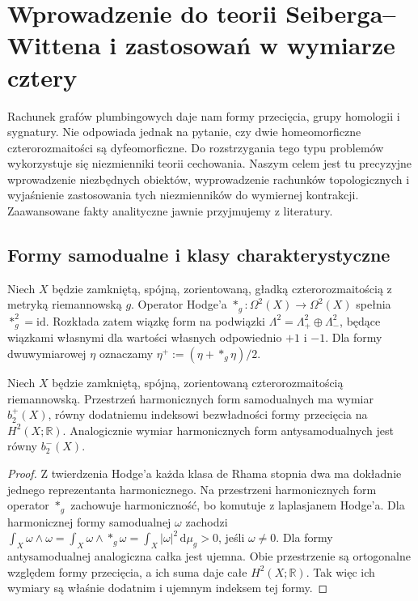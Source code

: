 \chapter{Wprowadzenie do teorii Seiberga--Wittena i zastosowań w wymiarze cztery}
\label{ch:tg-sw}

Rachunek grafów plumbingowych daje nam formy przecięcia,
grupy homologii i sygnatury. Nie odpowiada jednak na pytanie,
czy dwie homeomorficzne czterorozmaitości są dyfeomorficzne.
Do rozstrzygania tego typu problemów wykorzystuje się
niezmienniki teorii cechowania. Naszym celem jest tu
precyzyjne wprowadzenie niezbędnych obiektów, wyprowadzenie
rachunków topologicznych i wyjaśnienie zastosowania tych
niezmienników do wymiernej kontrakcji. Zaawansowane
fakty analityczne jawnie przyjmujemy z literatury.

\section{Formy samodualne i klasy charakterystyczne}
\label{sec:tg-sw-selfdual}

Niech $X$ będzie zamkniętą, spójną, zorientowaną,
gładką czterorozmaitością z metryką riemannowską $g$.
Operator Hodge'a $*_g:\Omega^2(X)\to\Omega^2(X)$ spełnia
$*_g^2=\mathrm{id}$. Rozkłada zatem wiązkę form na podwiązki
$\Lambda^2=\Lambda^2_+\oplus\Lambda^2_-$, będące wiązkami
własnymi dla wartości własnych odpowiednio $+1$ i $-1$.
Dla formy dwuwymiarowej $\eta$ oznaczamy
$\eta^+:=(\eta+*_g\eta)/2$.

\begin{stwierdzenie}
Niech $X$ będzie zamkniętą, spójną, zorientowaną
czterorozmaitością riemannowską. Przestrzeń harmonicznych
form samodualnych ma wymiar $b_2^+(X)$, równy dodatniemu
indeksowi bezwładności formy przecięcia na $H^2(X;\mathbb R)$.
Analogicznie wymiar harmonicznych form antysamodualnych
jest równy $b_2^-(X)$.
\end{stwierdzenie}

\begin{proof}
Z twierdzenia Hodge'a każda klasa de Rhama stopnia dwa
ma dokładnie jednego reprezentanta harmonicznego.
Na przestrzeni harmonicznych form operator $*_g$ zachowuje
harmoniczność, bo komutuje z laplasjanem Hodge'a.
Dla harmonicznej formy samodualnej $\omega$ zachodzi
$\int_X\omega\wedge\omega=\int_X\omega\wedge*_g\omega
=\int_X|\omega|^2\,\mathrm d\mu_g>0$, jeśli $\omega\ne0$.
Dla formy antysamodualnej analogiczna całka jest ujemna.
Obie przestrzenie są ortogonalne względem formy przecięcia,
a ich suma daje całe $H^2(X;\mathbb R)$.
Tak więc ich wymiary są właśnie dodatnim i ujemnym
indeksem tej formy.
\end{proof}

